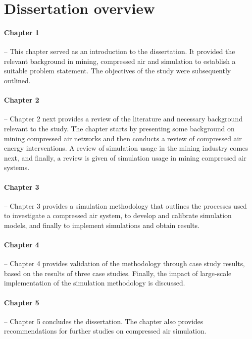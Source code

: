 \section{Dissertation overview}
	\paragraph{Chapter 1} \hspace{0.4cm} -- This chapter served as an introduction to the dissertation. It provided the relevant background in mining, compressed air and simulation to establish a suitable problem statement. The objectives of the study were subsequently outlined.
	\paragraph{Chapter 2} \hspace{0.4cm} -- Chapter 2 next provides a review of the literature and necessary background relevant to the study. The chapter starts by presenting some background on mining compressed air networks and then conducts a review of compressed air energy interventions. A review of simulation usage in the mining industry comes next, and finally, a review  is given of simulation usage in mining compressed air systems.
	\paragraph{Chapter 3} \hspace{0.4cm} -- Chapter 3 provides a simulation methodology that outlines the processes used to investigate a compressed air system, to develop and calibrate simulation models, and finally to implement simulations and obtain results.
	\paragraph{Chapter 4} \hspace{0.4cm} -- Chapter 4 provides validation of the methodology through case study results, based on the results of three case studies. Finally, the impact of large-scale implementation of the simulation methodology is discussed.
	\paragraph{Chapter 5} \hspace{0.4cm} -- Chapter 5 concludes the dissertation. The chapter also provides recommendations for further studies on compressed air simulation.
